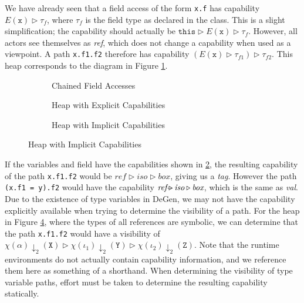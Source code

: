 We have already seen that a field access of the form \texttt{x.f} has capability $E(\texttt{x}) \triangleright \tau_f$, where $\tau_f$ is the field type as declared in the class. This is a slight simplification; the capability should actually be $\texttt{this} \triangleright E(\texttt{x}) \triangleright \tau_f$. However, all actors see themselves as \textit{ref}, which does not change a capability when used as a viewpoint. A path \texttt{x.f1.f2} therefore has capability $(E(\texttt{x}) \triangleright \tau_{f1}) \triangleright \tau_{f2}$. This heap corresponds to the diagram in Figure \ref{fig:vis-1}. 

\begin{figure}[H]
    \centering
    \begin{subfigure}[t]{0.3\textwidth}
    \centering
        
        \caption{Chained Field Accesses}
        \label{fig:vis-1}
    \end{subfigure}
    \hfill
    \begin{subfigure}[t]{0.3\textwidth}
        \centering
        
        \caption{Heap with Explicit Capabilities}
        \label{fig:vis-2}
    \end{subfigure}
    \hfill
    \begin{subfigure}[t]{0.3\textwidth}
        \centering
        
        \caption{Heap with Implicit Capabilities}
        \label{fig:vis-3}
    \end{subfigure}
\end{figure}

If the variables and field have the capabilities shown in \ref{fig:vis-2}, the resulting capability of the path \texttt{x.f1.f2} would be $\textit{ref} \triangleright \textit{iso} \triangleright \textit{box}$, giving us a \textit{tag}. However the path \texttt{(x.f1 = y).f2} would have the capability $\textit{ref} \extract \textit{iso} \triangleright \textit{box}$, which is the same as \textit{val}.  \\

Due to the existence of type variables in DeGen, we may not have the capability explicitly available when trying to determine the visibility of a path. For the heap in Figure \ref{fig:vis-3}, where the types of all references are symbolic, we can determine that the path \texttt{x.f1.f2} would have a visibility of $\chi(\alpha)\downarrow_2(\texttt{X}) \triangleright \chi(\iota_1)\downarrow_2(\texttt{Y}) \triangleright \chi(\iota_2)\downarrow_2(\texttt{Z})$. Note that the runtime environments do not actually contain capability information, and we reference them here as something of a shorthand. When determining the visibility of type variable paths, effort must be taken to determine the resulting capability statically. \\

